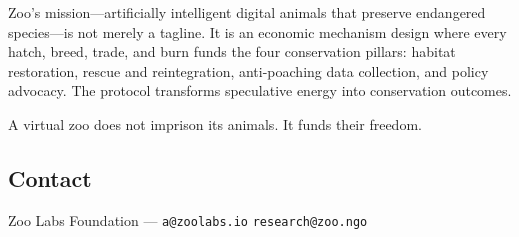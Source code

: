 \documentclass[11pt,letterpaper]{article}
\begin{document}
Zoo's mission---artificially intelligent digital animals that preserve endangered species---is not merely a tagline.  It is an economic mechanism design where every hatch, breed, trade, and burn funds the four conservation pillars: habitat restoration, rescue and reintegration, anti-poaching data collection, and policy advocacy.  The protocol transforms speculative energy into conservation outcomes.

A virtual zoo does not imprison its animals.  It funds their freedom.

\subsection*{Contact}

Zoo Labs Foundation --- \texttt{a@zoolabs.io} \quad \texttt{research@zoo.ngo}

\end{document}
